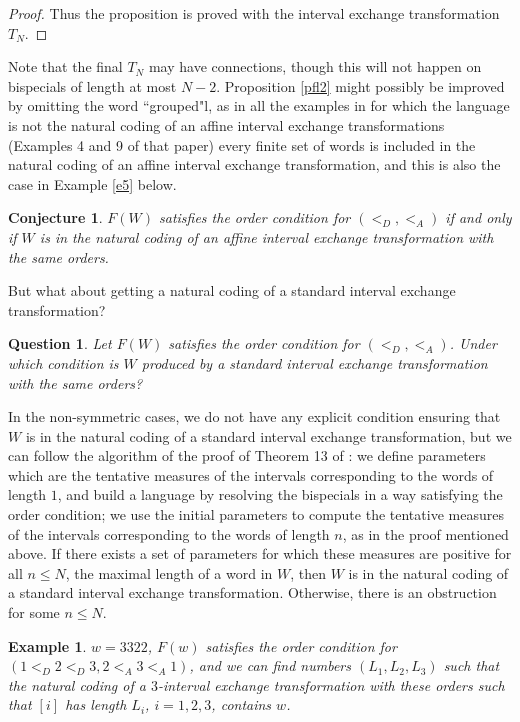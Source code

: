 \documentclass[12pt,a4paper]{amsart}
\newtheorem{question}{Question}
\newtheorem{example}{Example}
\newtheorem{conj}{Conjecture}
\begin{document}
\begin{proof}
Thus the proposition is proved with the interval exchange transformation $T_N$. \end{proof}

 Note that the final $T_N$ may have connections, though this will not happen on bispecials of length at most $N-2$.  Proposition \ref{pfl2} might possibly be improved by omitting the word ``grouped"l, as in  all the examples  in \cite{fhuz} for which the language is not the natural coding of an affine interval exchange transformations (Examples 4 and 9 of that paper) 
 every finite set of words is included in the natural coding of an affine  interval exchange transformation, and this is also the case in Example \ref{e5} below.
 
 \begin{conj}   $F(W)$ satisfies the order condition for  $(<_D,<_A)$ if and only if $W$ is in the natural coding of
an affine interval exchange transformation with the same orders.\end{conj}

But what about getting a natural coding of a standard interval exchange transformation? 
 
\begin{question} Let $F(W)$ satisfies the order condition for  $(<_D,<_A)$. Under which condition is $W$   produced by
a standard interval exchange transformation with the same orders? \end{question}

In the non-symmetric cases, we do not have any explicit condition ensuring that $W$ is in the natural coding of a standard interval exchange transformation, but we can follow the algorithm of the proof  of Theorem 13 of \cite{fhuz}: we define parameters which are the tentative measures of the intervals corresponding to the words of length $1$, and build a language by resolving the bispecials in a way satisfying the order condition;  we use the initial parameters to compute the tentative measures of the intervals corresponding to the words of length $n$, as in the proof mentioned above. If there exists a set  of parameters for which these measures are positive for all $n\leq N$, the maximal length of a word in $W$, then $W$ is in the natural coding  of a standard interval exchange transformation. Otherwise, there is an obstruction for some  $n\leq N$.  

\begin{example} $w=3322$, $F({w})$  satisfies the order condition for  $(1<_D 2<_D 3,2<_A 3<_A 1)$, and we can find numbers $(L_1,L_2, L_3)$ such that the natural coding of a $3$-interval exchange transformation with these  orders such that $[i]$ has length $L_i$, $i=1,2,3$, contains $w$. \end{example}
\end{document}
